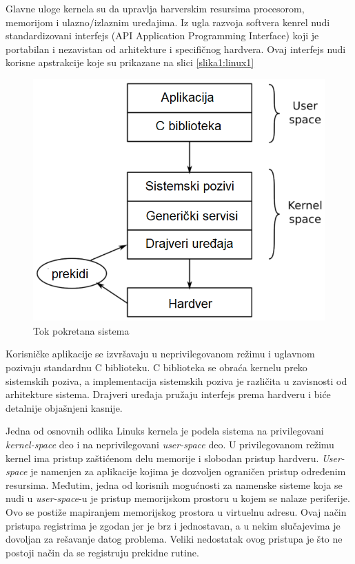 Glavne uloge kernela su da upravlja harverskim resursima procesorom, memorijom i ulazno/izlaznim uređajima. Iz ugla razvoja softvera kenrel nudi standardizovani interfejs (API Application Programming Interface) koji je portabilan i nezavistan od arhitekture i specifičnog hardvera. Ovaj interfejs nudi korisne apstrakcije koje su prikazane na slici \ref{slika1:linux1}
\begin{figure}[h!]
\centering
\includegraphics[scale=0.5]{img/linux1.png}
\caption{Tok pokretana sistema}
\label{slika1:linux1dd}
\end{figure}
Korisničke aplikacije se izvršavaju u neprivilegovanom režimu i uglavnom pozivaju standardnu C biblioteku. C biblioteka se obraća kernelu preko sistemskih poziva, a implementacija sistemskih poziva je različita u zavisnosti od arhitekture sistema. Drajveri uređaja pružaju interfejs prema hardveru i biće detalnije objašnjeni kasnije.

Jedna od osnovnih odlika Linuks kernela je podela sistema na privilegovani \textit{kernel-space} deo i na neprivilegovani \textit{user-space} deo. U privilegovanom režimu kernel ima pristup zaštićenom delu memorije i slobodan pristup hardveru. \textit{User-space} je namenjen za aplikacije kojima je dozvoljen ograničen pristup određenim resursima. Međutim, jedna od korisnih mogućnosti za namenske sisteme koja se nudi u \textit{user-space}-u je pristup memorijskom prostoru u kojem se nalaze periferije. Ovo se postiže mapiranjem memorijskog prostora u virtuelnu adresu. Ovaj način pristupa registrima je zgodan jer je brz i jednostavan, a u nekim slučajevima je dovoljan za rešavanje datog problema. Veliki nedostatak ovog pristupa je što ne postoji način da se registruju prekidne rutine.

